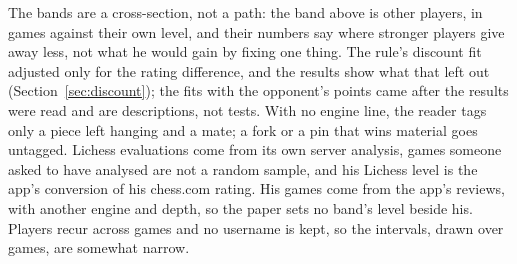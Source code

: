 \documentclass[11pt]{article}
\begin{document}
The bands are a cross-section, not a path: the band above is other players, in games against
their own level, and their numbers say where stronger players give away less, not what he would gain
by fixing one thing. The rule's discount fit adjusted only for the rating difference, and the
results show what that left out (Section~\ref{sec:discount}); the fits with the opponent's points
came after the results were read and are descriptions, not tests. With no engine line, the reader
tags only a piece left hanging and a mate; a fork or a pin that wins material goes untagged. Lichess
evaluations come from its own server analysis, games someone asked to have analysed are not a random
sample, and his Lichess level is the app's conversion of his chess.com rating. His games come from
the app's reviews, with another engine and depth, so the paper sets no band's level beside his.
Players recur across games and no username is kept, so the intervals, drawn over games, are somewhat
narrow.
\end{document}
